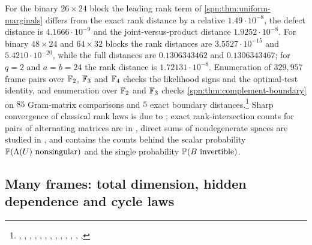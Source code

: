 For the binary $26\times24$ block the leading rank term of \cref{spn:thm:uniform-marginals} differs
from the exact rank distance by a relative $1.49\cdot10^{-8}$, the defect distance is
$4.1666\cdot10^{-9}$ and the joint-versus-product distance $1.9252\cdot10^{-8}$. For binary
$48\times24$ and $64\times32$ blocks the rank distances are $3.5527\cdot10^{-15}$ and
$5.4210\cdot10^{-20}$, while the full distances are $0.1306343462$ and $0.1306343467$; for $q=2$
and $a=b=24$ the rank distance is $1.72131\cdot10^{-8}$. Enumeration of $329{,}957$ frame pairs
over $\mathbb{F}_2$, $\mathbb{F}_3$ and $\mathbb{F}_4$ checks the likelihood signs and the optimal-test identity, and
enumeration over $\mathbb{F}_2$ and $\mathbb{F}_3$ checks \cref{spn:thm:complement-boundary} on $85$ Gram-matrix
comparisons and $5$ exact boundary
distances.\footnote{\raggedright{},
,
,
,
,
,
,
,
,
,
,
,
,
}
Sharp convergence of classical rank laws is due to \cite{Fulman2015Stein}; exact
rank-intersection counts for pairs of alternating matrices are in \cite{PottSchmidtZhou2016Pairs},
direct sums of nondegenerate spaces are studied in \cite{GlasbyNiemeyerPraeger2022Random}, and
\cite{DeBoeckVandeVoorde2024Anzahl} contains the counts behind the scalar probability
$\mathbb{P}(\Lambda(U)\text{ nonsingular})$ and the single probability $\mathbb{P}(B\text{ invertible})$.


\subsection{Many frames: total dimension, hidden dependence and cycle laws}\label{spn:sec:many}

